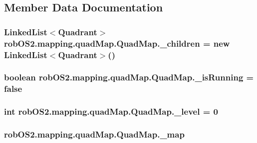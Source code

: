 \subsection{Member Data Documentation}
\hypertarget{classrob_o_s2_1_1mapping_1_1quad_map_1_1_quad_map_afa3d61b3214d5673b2760adbab9979f3}{
\subsubsection[{\_\-children}]{\setlength{\rightskip}{0pt plus 5cm}LinkedList$<${\bf Quadrant}$>$ {\bf robOS2.mapping.quadMap.QuadMap.\_\-children} = new LinkedList$<${\bf Quadrant}$>$()}}
\label{classrob_o_s2_1_1mapping_1_1quad_map_1_1_quad_map_afa3d61b3214d5673b2760adbab9979f3}
\hypertarget{classrob_o_s2_1_1mapping_1_1quad_map_1_1_quad_map_add1eeff613fb12f79b183939a3bef983}{
\subsubsection[{\_\-isRunning}]{\setlength{\rightskip}{0pt plus 5cm}boolean {\bf robOS2.mapping.quadMap.QuadMap.\_\-isRunning} = false}}
\label{classrob_o_s2_1_1mapping_1_1quad_map_1_1_quad_map_add1eeff613fb12f79b183939a3bef983}
\hypertarget{classrob_o_s2_1_1mapping_1_1quad_map_1_1_quad_map_a9f24ffcc536cedcc6f9b7412d716c516}{
\subsubsection[{\_\-level}]{\setlength{\rightskip}{0pt plus 5cm}int {\bf robOS2.mapping.quadMap.QuadMap.\_\-level} = 0}}
\label{classrob_o_s2_1_1mapping_1_1quad_map_1_1_quad_map_a9f24ffcc536cedcc6f9b7412d716c516}
\hypertarget{classrob_o_s2_1_1mapping_1_1quad_map_1_1_quad_map_a089973d65aee27b607e5d9a3d3752f71}{
\subsubsection[{\_\-map}]{ {\bf robOS2.mapping.quadMap.QuadMap.\_\-map}}}
